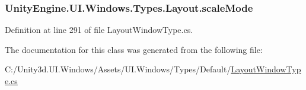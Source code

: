 \subsubsection[{scale\+Mode}]{ Unity\+Engine.\+U\+I.\+Windows.\+Types.\+Layout.\+scale\+Mode}\label{class_unity_engine_1_1_u_i_1_1_windows_1_1_types_1_1_layout_a0bbeabcabbf50cf8525e70db2a840c1a}


Definition at line 291 of file Layout\+Window\+Type.\+cs.



The documentation for this class was generated from the following file\+:\begin{DoxyCompactItemize}
\item 
C\+:/\+Unity3d.\+U\+I.\+Windows/\+Assets/\+U\+I.\+Windows/\+Types/\+Default/\hyperlink{_layout_window_type_8cs}{Layout\+Window\+Type.\+cs}\end{DoxyCompactItemize}
